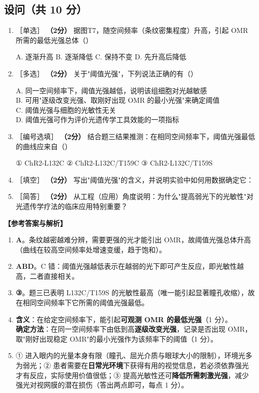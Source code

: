 \documentclass[UTF8,a4paper,11pt]{ctexart}
\newcommand{\ans}{\par\medskip\noindent\textbf{\color{deepblue}【参考答案与解析】}\par\smallskip}
\newcommand{\pt}[1]{\textbf{（#1分）}}
\newcommand{\tian}[1]{\underline{\hspace{#1}}}
\newcommand{\tg}[1]{{\small\color{deepgreen}［#1］}}
\newcommand{\choice}[1]{\par\smallskip\noindent #1\par}
\begin{document}
\subsection*{设问（共 10 分）}

\begin{enumerate}[leftmargin=2.1em,itemsep=5pt]
\item \tg{单选} \pt{2} 据图T7，随空间频率（条纹密集程度）升高，引起 OMR 所需的最低光强总体（\quad）\\
\choice{A. 逐渐升高 \quad B. 逐渐降低 \quad C. 保持不变 \quad D. 先升高后降低}

\item \tg{多选} \pt{2} 关于"阈值光强"，下列说法正确的有（\quad）\\
\choice{A. 同一空间频率下，阈值光强越低，说明该组细胞对光越敏感\\
B. 可用"逐级改变光强、取刚好出现 OMR 的最小光强"来确定阈值\\
C. 阈值光强与细胞的光敏性无关\\
D. 阈值光强可作为评价光遗传学工具效能的一项指标}

\item \tg{编号选填} \pt{2} 结合题三结果推测：在相同空间频率下，阈值光强最低的曲线应来自（\quad）\\
\choice{① ChR2-L132C \quad ② ChR2-L132C/T159C \quad ③ ChR2-L132C/T159S}

\item \tg{填空} \pt{2} 写出"阈值光强"的含义，并说明实验中如何用数据确定它：\tian{0.5\textwidth}

\item \tg{简答} \pt{2} 从工程（应用）角度说明：为什么"提高弱光下的光敏性"对光遗传学疗法的临床应用特别重要？
\end{enumerate}

\ans
\begin{enumerate}[leftmargin=2.1em,itemsep=3pt]
\item \textbf{A}。条纹越密越难分辨，需要更强的光才能引出 OMR，故阈值光强总体升高（曲线在较高空间频率处增速变缓，趋于饱和）。
\item \textbf{ABD}。C 错：阈值光强越低表示在越弱的光下即可产生反应，即光敏性越高，二者直接相关。
\item \textbf{③}。题三已表明 L132C/T159S 的光敏性最高（唯一能引起显著瞳孔收缩），故在相同空间频率下它所需的阈值光强最低。
\item \textbf{含义}：在给定空间频率下，能引起\textbf{可观测 OMR 的最低光强}（1 分）。\\
\textbf{确定方法}：在同一空间频率下由低到高\textbf{逐级改变光强}，记录是否出现 OMR，取"刚好出现稳定 OMR"的最小光强作为该频率下的阈值（1 分）。
\item ① 进入眼内的光量本身有限（瞳孔、屈光介质与眼球大小的限制），环境光多为弱光；② 患者需要在\textbf{日常光环境}下获得有用的视觉信息，若必须依靠强光才有反应，实际使用价值很低；③ 提高光敏性还可\textbf{降低所需刺激光强}，减少强光对视网膜的潜在损伤（答出两点即可，每点 1 分）。
\end{enumerate}
\end{document}
